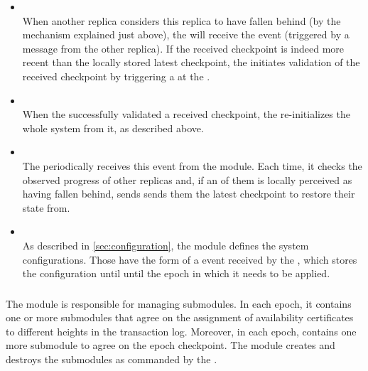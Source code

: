 \documentclass{article}
\begin{document}
\begin{itemize}
    \item {}\\
    When another replica considers this replica to have fallen behind (by the mechanism explained just above),
    the  will receive the  event
    (triggered by a message from the other replica).
    If the received checkpoint is indeed more recent than the locally stored latest checkpoint,
    the  initiates validation of the received checkpoint
    by triggering a  at the .

    \item {}\\
    When the  successfully validated a received checkpoint,
    the  re-initializes the whole system from it, as described above.

    \item {}\\
    The  periodically receives this event from the  module.
    Each time, it checks the observed progress of other replicas and,
    if an of them is locally perceived as having fallen behind,
    sends sends them the latest checkpoint to restore their state from.

    \item {}\\
    As described in \cref{sec:configuration}, the  module defines the system configurations.
    Those have the form of a  event received by the ,
    which stores the configuration until until the epoch in which it needs to be applied.

\end{itemize}

\subsubsection{}

The  module is responsible for managing  submodules.
In each epoch, it contains one or more submodules that agree on the assignment of availability certificates
to different heights in the transaction log.
Moreover, in each epoch,  contains one more submodule to agree on the epoch checkpoint.
The  module creates and destroys the submodules as commanded by the .
\end{document}
